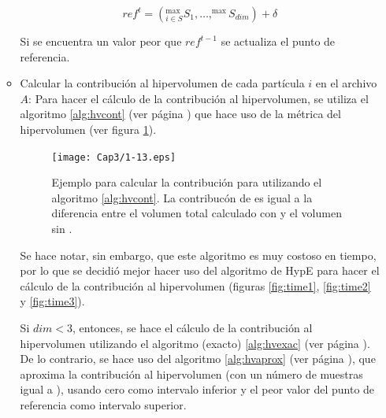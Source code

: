 \begin{enumerate}
\begin{itemize}
      \[ref^t = \left(^{\max}_{i\in S}S_1, \ldots, ^{\max}S_{dim} \right) + \delta\]

      Si se encuentra un valor peor que $ref^{t-1}$ se actualiza el punto de referencia. 

      \item Calcular la contribuci\'on al hipervolumen de cada part\'icula $i$ en el archivo $A$:       
      Para hacer el c\'alculo de la contribuci\'on al hipervolumen, se utiliza el algoritmo \ref{alg:hvcont} 
      (ver p\'agina \pageref{alg:hvcont}) que hace uso de la m\'etrica del hipervolumen (ver figura \ref{fig:contribucion}).

      \begin{figure}
      \begin{center}
	  \texttt{[image: Cap3/1-13.eps]}
      \end{center}
	\caption[Ejemplo de calculo de la contribuci\'on al hipervolumen]{Ejemplo para calcular la contribuci\'on para \DIFdelbeginFL {}\DIFdelendFL \DIFaddbeginFL {}\DIFaddendFL utilizando 
	el algoritmo \ref{alg:hvcont}. La contribuc\'on de \DIFdelbeginFL {}\DIFdelendFL \DIFaddbeginFL {}\DIFaddendFL es igual a la diferencia entre el volumen total calculado con \DIFdelbeginFL {}\DIFdelendFL \DIFaddbeginFL {}\DIFaddendFL y el 
	volumen sin \DIFdelbeginFL {}\DIFdelendFL \DIFaddbeginFL {}\DIFaddendFL .}
      \label{fig:contribucion}
      \end{figure}

      Se hace notar, sin embargo, que este algoritmo es muy costoso en tiempo, por lo que se 
      decidi\'o mejor hacer uso del algoritmo de HypE para hacer el c\'alculo de la contribuci\'on al hipervolumen
      (figuras \ref{fig:time1}, \ref{fig:time2} y \ref{fig:time3}).

      \DIFaddbegin {}\DIFaddend Si $dim < 3$, entonces, se hace el c\'alculo de la contribuci\'on al hipervolumen utilizando el algoritmo (exacto) \ref{alg:hvexac} 
      (ver p\'agina \pageref{alg:hvexac}). De lo contrario, se hace uso del algoritmo \ref{alg:hvaprox} 
      (ver p\'agina \pageref{alg:hvaprox}), que aproxima la contribuci\'on al hipervolumen (con un n\'umero de muestras 
      igual a \DIFdelbegin {}\DIFdelend \DIFaddbegin {}\DIFaddend ), usando cero como intervalo inferior y el peor valor del punto de referencia como intervalo superior.  
           \DIFdelbegin {}%


\end{itemize}
\end{enumerate}
